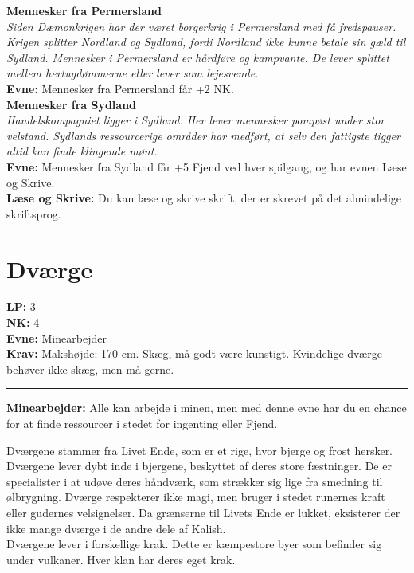 \textbf{Mennesker fra Permersland}\\
\textit{Siden Dæmonkrigen har der været borgerkrig i Permersland med få fredspauser. Krigen splitter Nordland og Sydland, fordi Nordland ikke kunne betale sin gæld til Sydland. Mennesker i Permersland er hårdføre og kampvante. De lever splittet mellem hertugdømmerne eller lever som lejesvende.}\\
\textbf{Evne:} Mennesker fra Permersland får +2 NK.\\

\textbf{Mennesker fra Sydland}\\
\textit{Handelskompagniet ligger i Sydland. Her lever mennesker pompøst under stor velstand. Sydlands ressourcerige områder har medført, at selv den fattigste tigger altid kan finde klingende mønt.}\\
\textbf{Evne:} Mennesker fra Sydland får +5 Fjend ved hver spilgang, og har evnen Læse og Skrive.\\
\textbf{Læse og Skrive:} Du kan læse og skrive skrift, der er skrevet på det almindelige skriftsprog.\\




\section*{Dværge}
\begin{race*}[Dværge]
\textbf{LP:} 3\\ 
\textbf{NK:} 4\\ 
\textbf{Evne:} Minearbejder\\
\textbf{Krav:} Makshøjde: 170 cm. Skæg, må godt være kunstigt. Kvindelige dværge behøver ikke skæg, men må gerne.\\
\rule{\textwidth}{0.4pt}
\textbf{Minearbejder:} Alle kan arbejde i minen, men med denne evne har du en chance for at finde ressourcer i stedet for ingenting eller Fjend.
\end{race*}

Dværgene stammer fra Livet Ende, som er et rige, hvor bjerge og frost hersker. Dværgene lever dybt inde i bjergene, beskyttet af deres store fæstninger. De er specialister i at udøve deres håndværk, som strækker sig lige fra smedning til ølbrygning. Dværge respekterer ikke magi, men bruger i stedet runernes kraft eller gudernes velsignelser. Da grænserne til Livets Ende er lukket, eksisterer der ikke mange dværge i de andre dele af Kalish.\\
Dværgene lever i forskellige krak. Dette er kæmpestore byer som befinder sig under vulkaner. Hver klan har deres eget krak.\\


